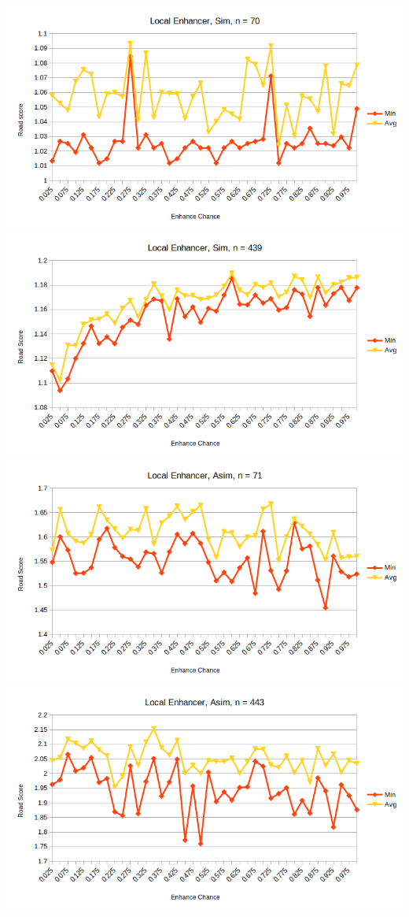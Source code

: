 \documentclass{article}
\begin{document}
\includegraphics[scale=0.36]{locEnhSim70}
\includegraphics[scale=0.36]{locEnhSim439}
\includegraphics[scale=0.36]{locEnhAsim71}
\includegraphics[scale=0.36]{locEnhAsim443}
\end{document}
